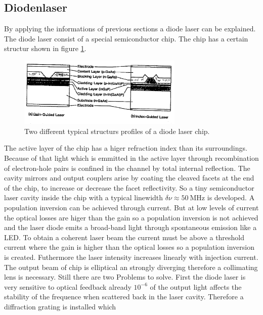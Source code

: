 \subsection{Diodenlaser}
\label{subsec:diodenlaser}
By applying the informations of previous sections
a diode laser can be explained.
The diode laser consist of a special semiconductor chip.
The chip has a certain structur shown in figure \ref{fig:chip}.
\begin{figure}
  \centering
  \includegraphics[width=0.7\textwidth]{chip.png}
  \caption{Two different typical structurs profiles of a diode laser chip.\cite{V61}}
  \label{fig:chip}
\end{figure}
The active layer of the chip has a higer refraction index than
its surroundings. Because of that light which is emmitted
in the active layer through recombination of electron-hole pairs
is confined in the channel by total internal reflection.
The cavity mirrors and output couplers arise
by coating the cleaved facets at the end of the chip,
to increase or decrease the facet reflectivity.
So a tiny semiconductor laser cavity inside the chip
with a typical linewidth
$\delta \nu \approx \SI{50}{\mega\hertz}$
is developed.
A population inversion
can be achieved through current.
But at low levels of current
the optical losses are higer than the gain
so a population inversion is not achieved and
the laser diode emits a broad-band light
through spontaneous emission
like a LED.
To obtain a coherent laser beam the current must be above
a threshold current where the gain is higher than the
optical losses so a population inversion is created.
Futhermore the laser intensity increases linearly with
injection current.
The output beam of chip is elliptical an strongly diverging
therefore a collimating lens is necessary.
Still there are two Problems to solve.
First the diode laser is very sensitive to optical feedback
already $10^{-6}$ of the output light affects
the stability of the frequence
when scattered back in the
laser cavity.
Therefore a diffraction grating is installed which
